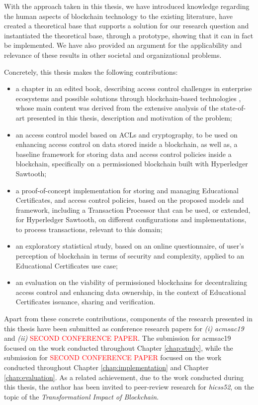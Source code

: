 With the approach taken in this thesis, we have introduced knowledge regarding the human aspects of blockchain technology to the existing literature, have created a theoretical base that supports a solution for our research question and instantiated the theoretical base, through a prototype, showing that it can in fact be implemented. We have also provided an argument for the applicability and relevance of these results in other societal and organizational problems.

Concretely, this thesis makes the following contributions:

\begin{itemize}
	\item a chapter in an edited book, describing access control challenges in enterprise ecosystems and possible solutions through blockchain-based technologies \cite{bryan_christiansen_access_2018}, whose main content was derived from the extensive analysis of the state-of-art presented in this thesis, description and motivation of the problem;
	\item an access control model based on ACLs and cryptography, to be used on enhancing access control on data stored inside a blockchain, as well as, a baseline framework for storing data and access control policies inside a blockchain, specifically on a permissioned blockchain built with Hyperledger Sawtooth;
	\item a proof-of-concept implementation for storing and managing Educational Certificates, and access control policies, based on the proposed models and framework, including a Transaction Processor that can be used, or extended, for Hyperledger Sawtooth, on different configurations and implementations, to process transactions, relevant to this domain;
	\item an exploratory statistical study, based on an online questionnaire, of user's perception of blockchain in terms of security and complexity, applied to an Educational Certificates use case;
	\item an evaluation on the viability of permissioned blockchains for decentralizing access control and enhancing data ownership, in the context of Educational Certificates issuance, sharing and verification.
\end{itemize}

Apart from these concrete contributions, components of the research presented in this thesis have been submitted as conference research papers for \emph{(i)} \textit{\gls{acmsac19}} and \emph{(ii)} \textcolor{red}{SECOND CONFERENCE PAPER}. The submission for \gls{acmsac19} focused on the work conducted throughout Chapter \ref{chap:study}, while the submission for \textcolor{red}{SECOND CONFERENCE PAPER} focused on the work conducted throughout Chapter \ref{chap:implementation} and Chapter \ref{chap:evaluation}. As a related achievement, due to the work conducted during this thesis, the author has been invited to peer-review research for \textit{\glsdesc{hicss52}}, on the topic of the \textit{Transformationl Impact of Blockchain}.

